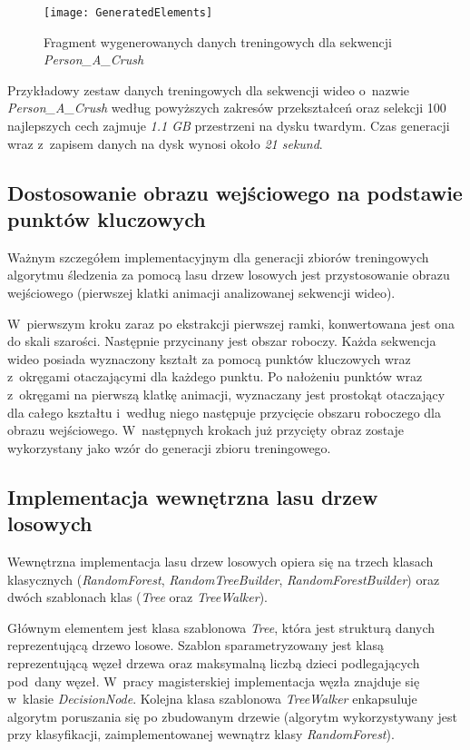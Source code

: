   \newpage

  \begin{figure}[!ht]
    \centering
    \texttt{[image: GeneratedElements]}
    \caption[Fragment wygenerowanych danych treningowych dla sekwencji Person\_A\_Crush]{Fragment wygenerowanych danych treningowych dla sekwencji \textit{Person\_A\_Crush}}
    \label{fig:GeneratedElements}
  \end{figure}

  Przykładowy zestaw danych treningowych dla sekwencji wideo o~nazwie \textit{Person\_A\_Crush} według powyższych zakresów przekształceń oraz selekcji 100 najlepszych cech zajmuje \textit{1.1 GB} przestrzeni na dysku twardym. Czas generacji wraz z~zapisem danych na dysk wynosi około \textit{21 sekund}.

  \subsection{Dostosowanie obrazu wejściowego na podstawie punktów kluczowych}\label{Subsection_AdjustFirstFrame}
  Ważnym szczegółem implementacyjnym dla generacji zbiorów treningowych algorytmu śledzenia za pomocą lasu drzew losowych jest przystosowanie obrazu wejściowego (pierwszej klatki animacji analizowanej sekwencji wideo).

  W~pierwszym kroku zaraz po ekstrakcji pierwszej ramki, konwertowana jest ona do skali szarości. Następnie przycinany jest obszar roboczy. Każda sekwencja wideo posiada wyznaczony kształt za pomocą punktów kluczowych wraz z~okręgami otaczającymi dla każdego punktu. Po nałożeniu punktów wraz z~okręgami na pierwszą klatkę animacji, wyznaczany jest prostokąt otaczający dla całego kształtu i~według niego następuje przycięcie obszaru roboczego dla obrazu wejściowego. W~następnych krokach już przycięty obraz zostaje wykorzystany jako wzór do generacji zbioru treningowego.

  \subsection{Implementacja wewnętrzna lasu drzew losowych}
  Wewnętrzna implementacja lasu drzew losowych opiera się na trzech klasach klasycznych (\textit{RandomForest}, \textit{RandomTreeBuilder}, \textit{RandomForestBuilder}) oraz dwóch szablonach klas (\textit{Tree} oraz \textit{TreeWalker}).

  Głównym elementem jest klasa szablonowa \textit{Tree}, która jest strukturą danych reprezentującą drzewo losowe. Szablon sparametryzowany jest klasą reprezentującą węzeł drzewa oraz maksymalną liczbą dzieci podlegających pod~dany węzeł. W~pracy magisterskiej implementacja węzła znajduje się w~klasie \textit{DecisionNode}. Kolejna klasa szablonowa \textit{TreeWalker} enkapsuluje algorytm poruszania się po zbudowanym drzewie (algorytm wykorzystywany jest przy klasyfikacji, zaimplementowanej wewnątrz klasy \textit{RandomForest}).

